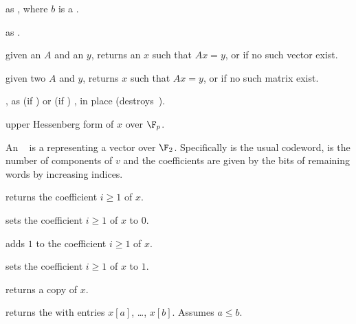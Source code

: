  as , where $b$ is
a .



 as .

 given an 
$A$ and an  $y$, returns an $x$ such that $Ax = y$, or 
if no such vector exist.

given two  $A$ and $y$, returns $x$ such that $Ax = y$, or 
if no such matrix exist.


, as  (if
) or  (if ) , in place
(destroys~).






 upper Hessenberg form of $x$ over $\F_p$.

  An ~ is a
 representing a vector over $\F_2$. Specifically  is
the usual codeword,  is the number of components of $v$ and the
coefficients are given by the bits of remaining words by increasing indices.

 returns the coefficient $i\ge 1$ of $x$.

 sets the coefficient $i\ge 1$ of $x$ to
$0$.

 adds $1$ to the coefficient $i\ge 1$ of $x$.

 sets the coefficient $i\ge 1$ of $x$ to $1$.

 returns a copy of $x$.

 returns the  with
entries $x[a]$, \dots, $x[b]$. Assumes $a \leq b$.

